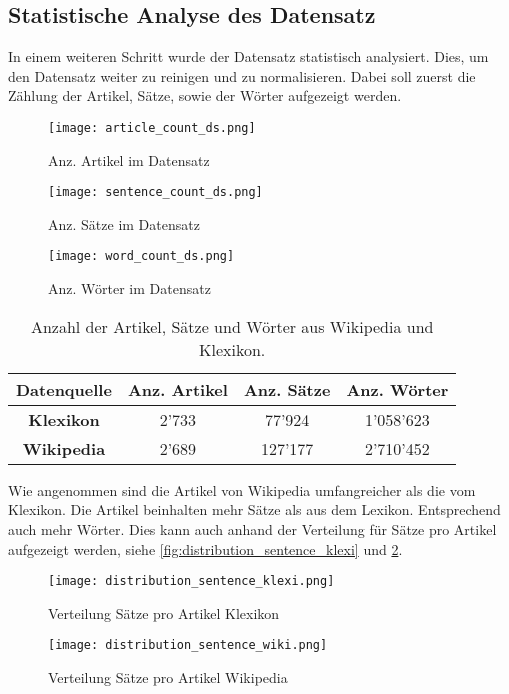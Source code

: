 \subsection{Statistische Analyse des Datensatz}
\label{sub:statistische_analyse_des_datensatz}
In einem weiteren Schritt wurde der Datensatz statistisch analysiert. Dies, um den Datensatz weiter zu reinigen und zu
normalisieren. Dabei soll zuerst die Zählung der Artikel, Sätze, sowie der Wörter aufgezeigt werden.
\begin{figure}[H]
      \texttt{[image: article\_count\_ds.png]}
      \caption{Anz. Artikel im Datensatz}\label{fig:article_count_ds}
    \endminipage\hfill
      \texttt{[image: sentence\_count\_ds.png]}
      \caption{Anz. Sätze im Datensatz}\label{fig:sentence_count_ds}
    \endminipage\hfill
      \texttt{[image: word\_count\_ds.png]}
      \caption{Anz. Wörter im Datensatz}\label{fig:word_count_ds}
    \endminipage       
\end{figure}
\begin{table}[H]
  \centering
  \begin{tabular}{|c|c|c|c|}
      \hline
      \textbf{Datenquelle}& \textbf{Anz. Artikel}& \textbf{Anz. Sätze}& \textbf{Anz. Wörter}\\
      \hline
      \textbf{Klexikon}& 2'733 & 77'924 & 1'058'623\\
      \hline
      \textbf{Wikipedia}& 2'689 & 127'177 & 2'710'452\\
      \hline
  \end{tabular}
  \caption{Anzahl der Artikel, Sätze und Wörter aus Wikipedia und Klexikon.}
\label{tab:dataset_count_wiki_klexi_base}
\end{table}
\noindent
Wie angenommen sind die Artikel von Wikipedia umfangreicher als die vom Klexikon. Die Artikel beinhalten mehr Sätze als
aus dem Lexikon. Entsprechend auch mehr Wörter. Dies kann auch anhand der Verteilung für Sätze pro Artikel aufgezeigt
werden, siehe \ref{fig:distribution_sentence_klexi} und \ref{fig:distribution_sentence_wiki}.
\begin{figure}[H]
    \texttt{[image: distribution\_sentence\_klexi.png]}
    \caption{Verteilung Sätze pro Artikel Klexikon}\label{fig:distribution_sentence_klexi}
  \endminipage\hfill
    \texttt{[image: distribution\_sentence\_wiki.png]}
    \caption{Verteilung Sätze pro Artikel Wikipedia}\label{fig:distribution_sentence_wiki}
  \endminipage\hfill     
\end{figure}
